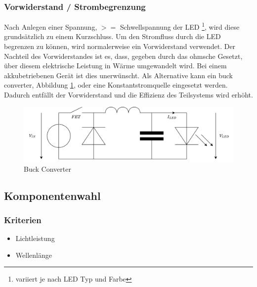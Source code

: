 \documentclass[12pt]{article}
\begin{document}
	\subsubsection*{Vorwiderstand / Strombegrenzung} \label{Vorwiderstand}
	Nach Anlegen einer Spannung, $>=$ Schwellspannung der LED \footnote{variiert je nach LED Typ und Farbe}, wird diese grundsätzlich zu einem Kurzschluss. Um den Stromfluss durch die LED begrenzen zu können, wird normalerweise ein Vorwiderstand verwendet. Der Nachteil des Vorwiderstandes ist es, dass, gegeben durch das ohmsche Gesetzt, über diesem elektrische Leistung in Wärme umgewandelt wird. Bei einem akkubetriebenen Gerät ist dies unerwünscht. Als Alternative kann ein buck converter, Abbildung \ref{fig:batbuck-converter}, oder eine Konstantstromquelle eingesetzt werden. Dadurch entfällt der Vorwiderstand und die Effizienz des Teilsystems wird erhöht.
	\begin{figure}[H]
		\centering
		\includegraphics[width=1\linewidth]{images/BAT_Buck-Converter}
		\caption{Buck Converter}
		\label{fig:batbuck-converter}
	\end{figure}
	
	\subsection{Komponentenwahl}
	\subsubsection{Kriterien}
	\begin{itemize}
		\item Lichtleistung 
		\item Wellenlänge
	\end{itemize}
\end{document}
